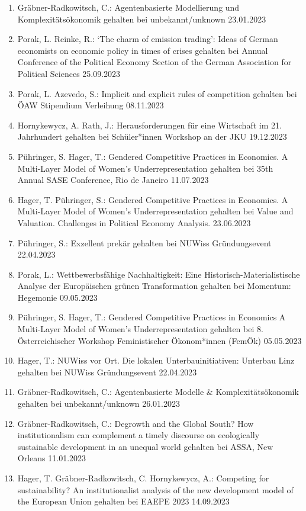 \begin{enumerate}
	\item Gräbner-Radkowitsch, C.: Agentenbasierte Modellierung und Komplexitätsökonomik gehalten bei unbekannt/unknown 23.01.2023
	\item Porak, L. Reinke, R.: ‘The charm of emission trading’: Ideas of German economists on economic policy in times of crises gehalten bei Annual Conference of the Political Economy Section of the German Association for Political Sciences 25.09.2023
	\item Porak, L. Azevedo, S.: Implicit and explicit rules of competition gehalten bei ÖAW Stipendium Verleihung 08.11.2023
	\item Hornykewycz, A. Rath, J.: Herausforderungen für eine Wirtschaft im 21. Jahrhundert gehalten bei Schüler*innen Workshop an der JKU 19.12.2023
	\item Pühringer, S. Hager, T.: Gendered Competitive Practices in Economics. A Multi-Layer Model of Women’s Underrepresentation gehalten bei 35th Annual SASE Conference, Rio de Janeiro 11.07.2023
	\item Hager, T. Pühringer, S.: Gendered Competitive Practices in Economics. A Multi-Layer Model of Women’s Underrepresentation gehalten bei Value and Valuation. Challenges in Political Economy Analysis. 23.06.2023
	\item Pühringer, S.: Exzellent prekär gehalten bei NUWiss Gründungsevent 22.04.2023
	\item Porak, L.: Wettbewerbsfähige Nachhaltigkeit: Eine Historisch-Materialistische Analyse der Europäischen grünen Transformation gehalten bei Momentum: Hegemonie 09.05.2023
	\item Pühringer, S. Hager, T.: Gendered Competitive Practices in Economics A Multi-Layer Model of Women’s Underrepresentation gehalten bei 8. Österreichischer Workshop Feministischer Ökonom*innen (FemÖk) 05.05.2023
	\item Hager, T.: NUWiss vor Ort. Die lokalen Unterbauinitiativen: Unterbau Linz gehalten bei NUWiss Gründungsevent 22.04.2023
	\item Gräbner-Radkowitsch, C.: Agentenbasierte Modelle \& Komplexitätsökonomik gehalten bei unbekannt/unknown 26.01.2023
	\item Gräbner-Radkowitsch, C.: Degrowth and the Global South? How institutionalism can complement a timely discourse on ecologically sustainable development in an unequal world gehalten bei ASSA, New Orleans 11.01.2023
	\item Hager, T. Gräbner-Radkowitsch, C. Hornykewycz, A.: Competing for sustainability? An institutionalist analysis of the new development model of the European Union gehalten bei EAEPE 2023 14.09.2023

\end{enumerate}
